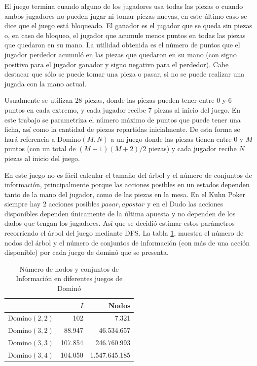 El juego termina cuando alguno de los jugadores usa todas las piezas o cuando ambos jugadores no pueden jugar ni tomar piezas nuevas, en este último caso se dice que el juego está bloqueado. El ganador es el jugador que se queda sin piezas o, en caso de bloqueo, el jugador que acumule menos puntos en todas las piezas que quedaron en su mano. La utilidad obtenida es el número de puntos que el jugador perdedor acumuló en las piezas que quedaron en su mano (con signo positivo para el jugador ganador y signo negativo para el perdedor). Cabe destacar que sólo se puede tomar una pieza o pasar, si no se puede realizar una jugada con la mano actual.

Usualmente se utilizan $28$ piezas, donde las piezas pueden tener entre $0$ y $6$ puntos en cada extremo, y cada jugador recibe $7$ piezas al inicio del juego. En este trabajo se parametriza el número máximo de puntos que puede tener una ficha, así como la cantidad de piezas repartidas inicialmente. De esta forma se hará referencia a Domino$(M, N)$ a un juego donde las piezas tienen entre $0$ y $M$ puntos (con un total de $(M+1)(M+2)/2$ piezas) y cada jugador recibe $N$ piezas al inicio del juego.

En este juego no es fácil calcular el tamaño del árbol y el número de conjuntos de información, principalmente porque las acciones posibles en un estados dependen tanto de la mano del jugador, como de las piezas en la mesa. En el Kuhn Poker siempre hay $2$ acciones posibles ${pasar, apostar}$ y en el Dudo las acciones disponibles dependen únicamente de la última apuesta y no dependen de los dados que tengan los jugadores. Así que se decidió estimar estos parámetros recorriendo el árbol del juego mediante DFS. La tabla \ref{tab:tree-domino}, muestra el número de nodos del árbol y el número de conjuntos de información (con más de una acción disponible) por cada juego de dominó que se presenta.

\begin{table}
    \centering
    \begin{tabular}{c r r}
    \hline
        & $I$ & Nodos \\ \hline
       Domino$(2, 2)$ &     102 &         7.321 \\
       Domino$(3, 2)$ &  88.947 &    46.534.657 \\
       Domino$(3, 3)$ & 107.854 &   246.760.993 \\ 
       Domino$(3, 4)$ & 104.050 & 1.547.645.185 \\ \hline
    \end{tabular}
    \caption{Número de nodos y conjuntos de Información en diferentes juegos de Dominó}
    \label{tab:tree-domino}
\end{table}


